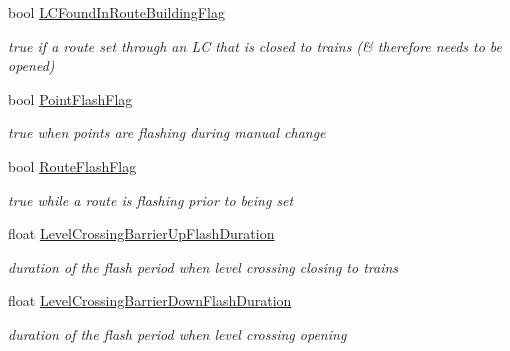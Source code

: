 \begin{DoxyCompactItemize}
\mbox{\label{class_t_track_a3be055d3c016ced93635700d7da9a2da}} 
bool \mbox{\hyperlink{class_t_track_a3be055d3c016ced93635700d7da9a2da}{L\+C\+Found\+In\+Route\+Building\+Flag}}
\begin{DoxyCompactList}\small\item\em true if a route set through an LC that is closed to trains (\& therefore needs to be opened) \end{DoxyCompactList}\item 
\mbox{\label{class_t_track_a50f518fa93ef56b1570e4102fb691e14}} 
bool \mbox{\hyperlink{class_t_track_a50f518fa93ef56b1570e4102fb691e14}{Point\+Flash\+Flag}}
\begin{DoxyCompactList}\small\item\em true when points are flashing during manual change \end{DoxyCompactList}\item 
\mbox{\label{class_t_track_aa66417417a7767acb35425dfa4754311}} 
bool \mbox{\hyperlink{class_t_track_aa66417417a7767acb35425dfa4754311}{Route\+Flash\+Flag}}
\begin{DoxyCompactList}\small\item\em true while a route is flashing prior to being set \end{DoxyCompactList}\item 
\mbox{\label{class_t_track_a33051ac63ce31022cba42eec28611ca0}} 
float \mbox{\hyperlink{class_t_track_a33051ac63ce31022cba42eec28611ca0}{Level\+Crossing\+Barrier\+Up\+Flash\+Duration}}
\begin{DoxyCompactList}\small\item\em duration of the flash period when level crossing closing to trains \end{DoxyCompactList}\item 
\mbox{\label{class_t_track_a6edc256a0cefda4c7a51c79004b83597}} 
float \mbox{\hyperlink{class_t_track_a6edc256a0cefda4c7a51c79004b83597}{Level\+Crossing\+Barrier\+Down\+Flash\+Duration}}
\begin{DoxyCompactList}\small\item\em duration of the flash period when level crossing opening \end{DoxyCompactList}\item 

\end{DoxyCompactItemize}
